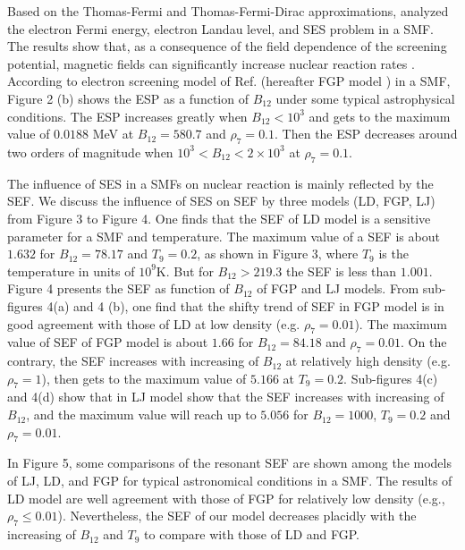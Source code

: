 \documentclass[manuscript]{aastex}
\begin{document}
Based on the Thomas-Fermi and Thomas-Fermi-Dirac approximations,
\citet{Fushiki89} analyzed the electron Fermi energy, electron
Landau level, and SES problem in a SMF. The results show that, as a
consequence of the field dependence of the screening potential,
magnetic fields can significantly increase nuclear reaction rates
\citep{Fushiki89}. According to electron screening model of
Ref.\citep{Fushiki89} (hereafter FGP model ) in a SMF, Figure 2 (b)
shows the ESP as a function of $B_{12}$ under some typical
astrophysical conditions. The ESP increases greatly when
$B_{12}<10^3$ and gets to the maximum value of $0.0188$ MeV at
$B_{12}=580.7$ and $\rho_7=0.1$. Then the ESP decreases around two
orders of magnitude when $10^3<B_{12}<2\times10^3$ at $\rho_7=0.1$.

The influence of SES in a SMFs on nuclear reaction is mainly
reflected by the SEF. We discuss the influence of SES on SEF by
three models (LD, FGP, LJ) from Figure 3 to Figure 4. One finds that
the SEF of LD model is a sensitive parameter for a SMF and
temperature. The maximum value of a SEF is about $1.632$ for
$B_{12}=78.17$ and $T_9=0.2$, as shown in Figure 3, where $T_9$ is
the temperature in units of $10^9$K. But for $B_{12}>219.3$ the SEF
is less than $1.001$. Figure 4 presents the SEF as function of
$B_{12}$ of FGP and LJ models. From sub-figures 4(a) and 4 (b), one
find that the shifty trend of SEF in FGP model is in good agreement
with those of LD at low density (e.g. $\rho_7=0.01$). The maximum
value of SEF of FGP model is about $1.66$ for $B_{12}=84.18$ and
$\rho_7=0.01$. On the contrary, the SEF increases with increasing of
$B_{12}$ at relatively high density (e.g. $\rho_7=1$), then gets to
the maximum value of $5.166$ at $T_9=0.2$. Sub-figures 4(c) and 4(d)
show that in LJ model show that the SEF increases with increasing of
$B_{12}$, and the maximum value will reach up to $5.056$ for
$B_{12}=1000$, $T_9=0.2$ and $\rho_7=0.01$.


In Figure 5, some comparisons of the resonant SEF are shown among
the models of LJ, LD, and FGP for typical astronomical conditions in
a SMF. The results of LD model are well agreement with those of FGP
for relatively low density (e.g., $\rho_7\leqslant 0.01$).
Nevertheless, the SEF of our model decreases placidly with the
increasing of $B_{12}$ and $T_9$ to compare with those of LD and
FGP.
\end{document}
